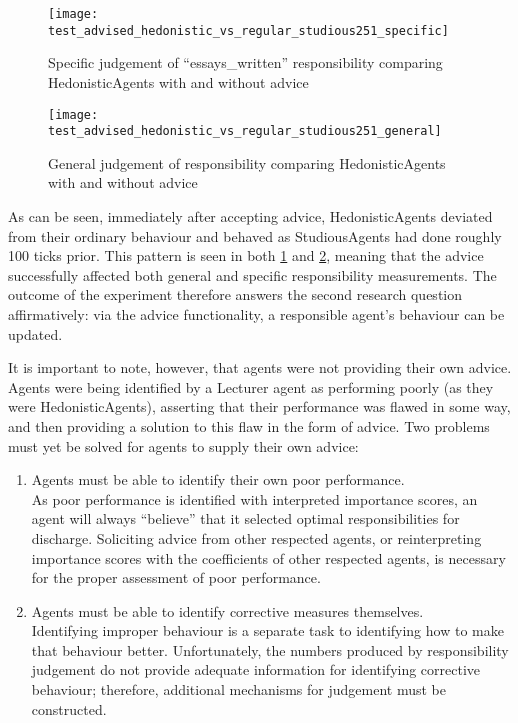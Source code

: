 \begin{figure}[h]
    \centering
    \texttt{[image: test\_advised\_hedonistic\_vs\_regular\_studious251\_specific]}
    \caption{Specific judgement of ``essays\_written'' responsibility comparing HedonisticAgents with and without advice}
    \label{fig:2}
\end{figure}

\begin{figure}[h]
    \centering
    \texttt{[image: test\_advised\_hedonistic\_vs\_regular\_studious251\_general]}
    \caption{General judgement of responsibility comparing HedonisticAgents with and without advice}
    \label{fig:3}
\end{figure}

As can be seen, immediately after accepting advice, HedonisticAgents deviated from their ordinary behaviour and behaved as StudiousAgents had done roughly 100 ticks prior. This pattern is seen in both \cref{fig:2} and \cref{fig:3}, meaning that the advice successfully affected both general and specific responsibility measurements. The outcome of the experiment therefore answers the second research question affirmatively: via the advice functionality, a responsible agent's behaviour can be updated.\par

It is important to note, however, that agents were not providing their own advice. Agents were being identified by a Lecturer agent as performing poorly (as they were HedonisticAgents), asserting that their performance was flawed in some way, and then providing a solution to this flaw in the form of advice. Two problems must yet be solved for agents to supply their own advice:

\begin{enumerate}
    \item Agents must be able to identify their own poor performance.\\
        As poor performance is identified with interpreted importance scores, an agent will always ``believe'' that it selected optimal responsibilities for discharge. Soliciting advice from other respected agents, or reinterpreting importance scores with the coefficients of other respected agents, is necessary for the proper assessment of poor performance.
    \item Agents must be able to identify corrective measures themselves.\\
        Identifying improper behaviour is a separate task to identifying how to make that behaviour better. Unfortunately, the numbers produced by responsibility judgement do not provide adequate information for identifying corrective behaviour; therefore, additional mechanisms for judgement must be constructed.
\end{enumerate}

